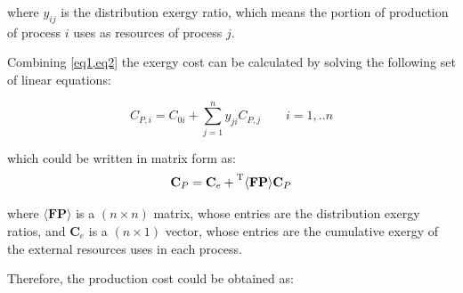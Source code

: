 \documentclass[sustainability,article,submit,moreauthors,pdftex,12pt,a4paper]{mdpi}
\newcommand{\mbr}[1]{\ensuremath{\langle \textbf{#1} \rangle}}
\newcommand{\tmbr}[1]{\ensuremath{\prescript{\mathrm{T}}{}{\langle \textbf{#1} \rangle}}}
\newcommand{\vm}[1]{\ensuremath{\mathbf{#1}}}
\begin{document}
\noindent where $y_{ij}$ is the distribution exergy ratio, which means the portion of production of process $i$ uses as resources of process $j$.

Combining \cref{eq1,eq2} the exergy cost can be calculated by solving the following set of linear equations:

\begin{equation}
C_{P,i}=C_{0i}+\sum_{j=1}^{n}{y_{ji}C_{P,j}} \qquad i=1,..n
\end{equation}

\noindent which could be written in matrix form as:
\begin{equation}
\vm{C}_P = \vm{C}_e + \tmbr{FP} \vm{C}_P
\end{equation}

\noindent where \mbr{FP} is a $(n \times n)$ matrix, whose entries are the distribution exergy ratios, and $\vm{C}_e$ is a $(n \times 1)$ vector, whose entries are the cumulative exergy of the external resources uses in each process.

Therefore, the production cost could be obtained as:
\end{document}
